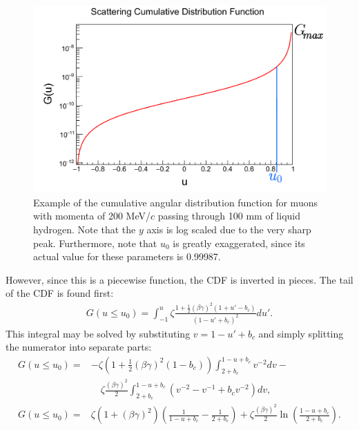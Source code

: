 \begin{figure}
  \centering
    \includegraphics[width=\textwidth]{Figures/scatdist_example} 
  \caption[Example of the COSY cumulative angular distribution function.]{Example of the cumulative angular distribution function for muons with momenta of 200 MeV/$c$ passing through 100 mm of liquid hydrogen. Note that the $y$ axis is log scaled due to the very sharp peak. Furthermore, note that $u_0$ is greatly exaggerated, since its actual value for these parameters is 0.99987.}
  \label{fig:scatdist_example}
\end{figure}

However, since this is a piecewise function, the CDF is inverted in pieces. The tail of the CDF is found first:
\begin{align*}
G(u\leq u_0)=\int _{-1} ^u \zeta \frac{1+\frac{1}{2}(\beta\gamma)^2 (1+u'-b_c)}{(1-u'+b_c)^2} du'.
\end{align*}
This integral may be solved by substituting $v=1-u'+b_c$ and simply splitting the numerator into separate parts:
\begin{align}
\nonumber
G(u\leq u_0)=&-\zeta(1+\frac{1}{2}(\beta\gamma)^2(1-b_c))\int_{2+b_c} ^{1-u+b_c} v^{-2} dv - \\
\nonumber
& \quad \zeta \frac{(\beta\gamma)^2}{2}\int_{2+b_c} ^{1-u+b_c} (v^{-2} - v^{-1} + b_c v^{-2}) dv,\\
G(u\leq u_0)=&\zeta(1+(\beta\gamma)^2)\left(\frac{1}{1-u+b_c} - \frac{1}{2+b_c}\right)+\zeta \frac{(\beta\gamma)^2}{2} \ln\left(\frac{1-u+b_c}{2+b_c}\right). \label{eqn:cosyGTail}
\end{align}

